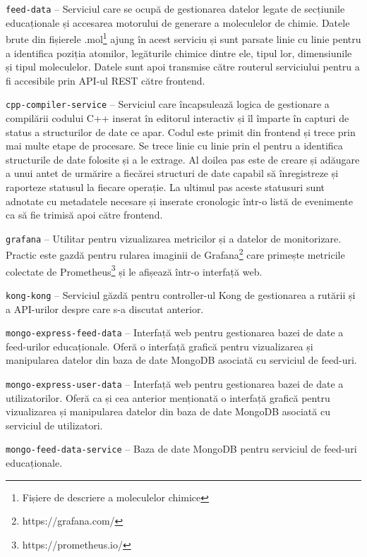   \texttt{feed-data} – Serviciul care se ocupă de gestionarea datelor legate de secțiunile educaționale și 
  accesarea motorului de generare a moleculelor de chimie. Datele brute din fișierele .mol\footnote{Fișiere de descriere a
  moleculelor chimice} ajung în acest serviciu și sunt parsate linie cu linie pentru a identifica poziția atomilor,
  legăturile chimice dintre ele, tipul lor, dimensiunile și tipul moleculelor. Datele sunt apoi
  transmise către routerul serviciului pentru a fi accesibile prin API-ul REST către frontend.

   \texttt{cpp-compiler-service} – Serviciul care încapsulează logica de gestionare a compilării codului C++
  inserat în editorul interactiv și îl împarte în capturi de status a structurilor de date ce apar. Codul
  este primit din frontend și trece prin mai multe etape de procesare. Se trece linie cu linie prin el pentru a identifica
  structurile de date folosite și a le extrage. Al doilea pas este de creare și adăugare a unui antet de urmărire a
  fiecărei structuri de date capabil să înregistreze și raporteze statusul la fiecare operație. La ultimul pas 
  aceste statusuri sunt adnotate cu metadatele necesare și inserate cronologic într-o listă de evenimente ca să
  fie trimisă apoi către frontend.

  \texttt{grafana} – Utilitar pentru vizualizarea metricilor și a datelor de monitorizare. Practic este gazdă pentru
  rularea imaginii de Grafana\footnote{https://grafana.com/} care primește metricile colectate de Prometheus\footnote{https://prometheus.io/} 
  și le afișează într-o interfață web.

  \texttt{kong-kong} – Serviciul găzdă pentru controller-ul Kong de gestionarea a rutării și a API-urilor despre care s-a discutat anterior.
  

  \texttt{mongo-express-feed-data} – Interfață web pentru gestionarea bazei de date a feed-urilor educaționale. Oferă
  o interfață grafică pentru vizualizarea și manipularea datelor din baza de date MongoDB asociată cu serviciul de feed-uri.
   
  \texttt{mongo-express-user-data} – Interfață web pentru gestionarea bazei de date a utilizatorilor. Oferă ca și cea
  anterior menționată o interfață grafică pentru vizualizarea și manipularea datelor din baza de date MongoDB asociată
  cu serviciul de utilizatori.

   \texttt{mongo-feed-data-service} – Baza de date MongoDB pentru serviciul de feed-uri educaționale.
   
